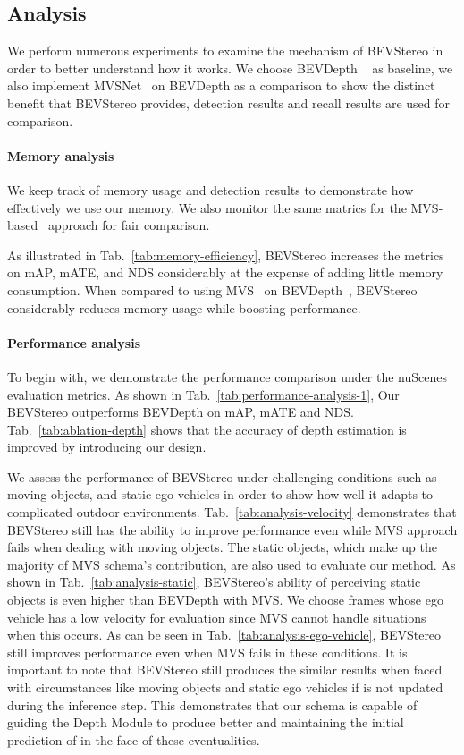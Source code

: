 \documentclass[letterpaper]{article} \usepackage[]{aaai23}  \usepackage{times}  \usepackage{helvet}  \usepackage{courier}  \usepackage[hyphens]{url}  \usepackage{graphicx} \urlstyle{rm} \def\UrlFont{\rm}  \usepackage{natbib}  \usepackage{caption} \frenchspacing  \setlength{\pdfpagewidth}{8.5in} \setlength{\pdfpageheight}{11in} \usepackage{algorithm}
\begin{document}
\subsection{Analysis}
We perform numerous experiments to examine the mechanism of BEVStereo in order to better understand how it works. We choose BEVDepth ~\cite{li2022bevdepth} as baseline, we also implement MVSNet~\cite{yao2018mvsnet} on BEVDepth as a comparison to  show the distinct benefit that BEVStereo provides,  detection results and recall results are used for comparison.
\paragraph{Memory analysis}
We keep track of memory usage and detection results to demonstrate how effectively we use our memory. We also monitor the same matrics for the MVS-based~\cite{yao2018mvsnet} approach for fair comparison.

As illustrated in Tab.~\ref{tab:memory-efficiency}, BEVStereo increases the metrics on mAP, mATE, and NDS considerably at the expense of adding little memory consumption. When compared to using MVS~\cite{yao2018mvsnet} on BEVDepth~\cite{li2022bevdepth}, BEVStereo considerably reduces memory usage while boosting performance.

\paragraph{Performance analysis}
To begin with, we demonstrate the performance comparison under the nuScenes~\cite{caesar2020nuscenes} evaluation metrics. As shown in Tab.~\ref{tab:performance-analysis-1}, Our BEVStereo outperforms BEVDepth on mAP, mATE and NDS. Tab.~\ref{tab:ablation-depth} shows that the accuracy of depth estimation is improved by introducing our design.

We assess the performance of BEVStereo under challenging conditions such as moving objects, and static ego vehicles in order to show how well it adapts to complicated outdoor environments. Tab.~\ref{tab:analysis-velocity} demonstrates that BEVStereo still has the ability to improve performance even while MVS approach fails when dealing with moving objects. The static objects, which make up the majority of MVS schema's contribution, are also used to evaluate our method. As shown in Tab.~\ref{tab:analysis-static}, BEVStereo's ability of perceiving static objects is even higher than BEVDepth with MVS. We choose frames whose ego vehicle has a low velocity for evaluation since MVS cannot handle situations when this occurs. As can be seen in Tab.~\ref{tab:analysis-ego-vehicle}, BEVStereo still improves performance even when MVS fails in these conditions. It is important to note that BEVStereo still produces the similar results when faced with circumstances like moving objects and static ego vehicles if  is not updated during the inference step. This demonstrates that our schema is capable of guiding the Depth Module to produce better  and maintaining the initial prediction of  in the face of these eventualities.
\end{document}
